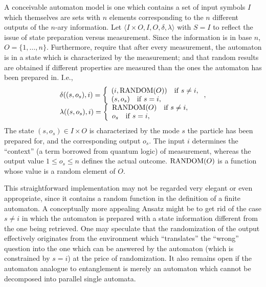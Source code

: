 \documentclass{llncs}
\begin{document}
A conceivable automaton model is one which contains a set of input symbols $I$ which themselves
are sets with $n$ elements corresponding to the $n$ different outputs of the $n$-ary information.
Let
$\langle I\times O,I,O,\delta ,\lambda \rangle$
with $S=I$ to reflect the issue of state preparation versus measurement.
Since the information is in base $n$, $O=\{1,\ldots ,n\}$.
Furthermore, require that after every measurement, the automaton is in a state
which is characterized by the measurement; and that random results are obtained if
different properties are measured than the ones the automaton has been prepared in. I.e.,
\begin{equation}
\begin{array}{llllll}
\delta ((s,o_s),i)=\left\{
{
\begin{array}{llllll}
(i,{\rm RANDOM}(O)) \quad {\rm if}\; s\neq i,\\
 (s,o_s) \quad {\rm if}\; s = i,
\end{array}
}
\right. ,\\
\lambda ((s,o_s),i)=\left\{
{
\begin{array}{llllll}
{\rm RANDOM}(O) \quad {\rm if}\; s\neq i,\\
 o_s \quad {\rm if}\; s = i,
\end{array}
}
\right.
\end{array}
\end{equation}
The state $(s,o_s)\in I\times O$
is characterized by the mode $s$ the particle has been prepared for,
and the corresponding output $o_s$.
The input $i$ determines the ``context'' (a term borrowed from quantum logic)
of measurement,
whereas the output value $1\le o_s\le n$ defines the actual outcome.
${\rm RANDOM}(O)$ is a function whose value is a random element of $O$.

This straightforward implementation may not be regarded very elegant or even appropriate,
since it contains a random function in the definition of a finite automaton.
A conceptually more appealing Ansatz might be to get rid of the case $s\neq i$ in
which the automaton is prepared with a state information different from the one being retrieved.
One may speculate that the randomization of the output effectively originates from the
environment which ``translates'' the ``wrong'' question into the one which can be
answered by the automaton (which is constrained by $s=i$) at the price of randomization.
It also remains open if the automaton analogue to entanglement is merely an automaton
which cannot be decomposed into parallel single automata.
\end{document}

